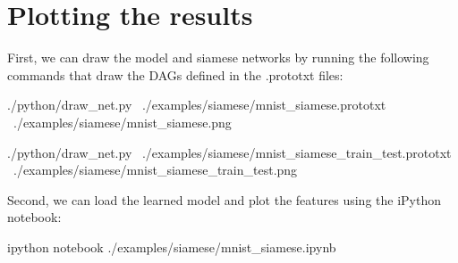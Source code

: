 \section*{Plotting the results}

First, we can draw the model and siamese networks by running the following commands that draw the D\+A\+Gs defined in the .prototxt files\+: \begin{DoxyVerb}./python/draw_net.py \
    ./examples/siamese/mnist_siamese.prototxt \
    ./examples/siamese/mnist_siamese.png

./python/draw_net.py \
    ./examples/siamese/mnist_siamese_train_test.prototxt \
    ./examples/siamese/mnist_siamese_train_test.png
\end{DoxyVerb}


Second, we can load the learned model and plot the features using the i\+Python notebook\+: \begin{DoxyVerb}ipython notebook ./examples/siamese/mnist_siamese.ipynb\end{DoxyVerb}
 